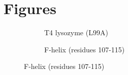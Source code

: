 \documentclass[journal=jctcce,manuscript=article]{achemso}
\begin{document}
\newpage
\section*{Figures}

\begin{figure}[!ht]
\begin{subfigure}[t]{0.5\linewidth}
   \centering
   \caption{T4 lysozyme (L99A)}
   \label{fig:T4-L99A_protein}
\end{subfigure}\hfill
\centering
\begin{subfigure}[t]{0.5\linewidth}
  \centering
  \caption{F-helix (residues 107-115)}
  \label{fig:T4-L99A_tube}

\end{subfigure}
\end{figure}
\end{document}
